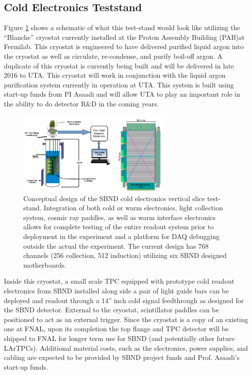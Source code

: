 \subsection{Cold Electronics Teststand}\label{sec:SBNDTeststand}
Figure \ref{fig:teststand} shows a schematic of what this test-stand would look like utilizing the ``Blanche'' cryostat currently installed at the Proton Assembly Building (PAB)at Fermilab. This cryostat is engineered to have delivered purified liquid argon into the cryostat as well as circulate, re-condense, and purify boil-off argon. A duplicate of this cryostat is currently being built and will be delivered in late 2016 to UTA. This cryostat will work in conjunction with the liquid argon purification system currently in operation at UTA. This system is built using start-up funds from PI Asaadi and will allow UTA to play an important role in the ability to do detector R$\&$D in the coming years. 

\begin{figure}[htb]
\centering
\includegraphics[width=0.68\textwidth]{images/teststand3.png}
\caption[]{Conceptual design of the SBND cold electronics vertical slice test-stand. Integration of both cold or warm electronics, light collection system, cosmic ray paddles, as well as warm interface electronics allows for complete testing of the entire readout system prior to deployment in the experiment and a platform for DAQ debugging outside the actual the experiment. The current design has 768 channels (256 collection, 512 induction) utilizing six SBND designed motherboards.}
\label{fig:teststand}
\end{figure} 

Inside this cryostat, a small scale TPC equipped with prototype cold readout electronics from SBND installed along side a pair of light guide bars can be deployed and readout through a 14'' inch cold signal feedthrough as designed for the SBND detector. External to the cryostat, scintillator paddles can be positioned to act as an external trigger. Since the cryostat is a copy of an existing one at FNAL, upon its completion the top flange and TPC detector will be shipped to FNAL for longer term use for SBND (and potentially other future LArTPCs). Additional material costs, such as the electronics, power supplies, and cabling are expected to be provided by SBND project funds and Prof. Asaadi's start-up funds.

